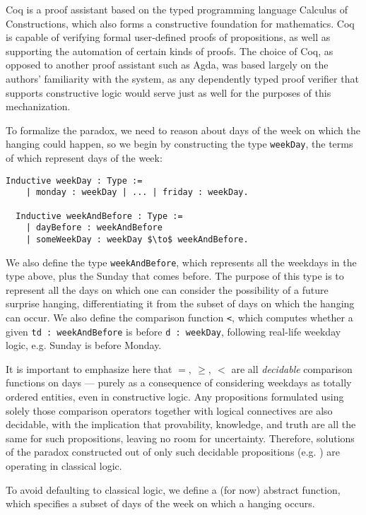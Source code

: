 \documentclass[runningheads]{llncs}
\begin{document}
Coq is a proof assistant based on the typed programming language Calculus of Constructions, which also forms a constructive foundation for mathematics.
Coq is capable of verifying formal user-defined proofs of propositions, as well as supporting
the automation of certain kinds of proofs. The choice of Coq, as opposed to another
proof assistant such as Agda, was based largely on the authors' familiarity with the system,
as any dependently typed proof verifier that supports constructive logic
would serve just as well for the purposes of this mechanization.

To formalize the paradox, we need to reason about days of the week on which
the hanging could happen, so we
begin by constructing the type {\tt weekDay}, the terms of which represent
days of the week:

\begin{lstlisting}[mathescape=true]
  Inductive weekDay : Type :=
    | monday : weekDay | ... | friday : weekDay.

  Inductive weekAndBefore : Type :=
    | dayBefore : weekAndBefore
    | someWeekDay : weekDay $\to$ weekAndBefore.
\end{lstlisting}

We also define the type {\tt weekAndBefore}, which represents all the weekdays in
the type above, plus the Sunday that comes before. The purpose of this type is to
represent all the days on which one can consider the possibility of a future
surprise hanging,
differentiating it from the subset of days on which the hanging can occur. We
also define the comparison function {\tt <}, which computes
whether a given {\tt td : weekAndBefore} is before {\tt d : weekDay},
following real-life weekday logic, e.g. Sunday is before Monday.

It is important to emphasize here that $=,~\geq,~<$ are all \emph{decidable}
comparison functions on days --- purely as a consequence of considering weekdays
as totally ordered entities, even in constructive logic. Any propositions
formulated using solely those comparison operators together with logical connectives are also decidable,
with the implication that provability, knowledge, and truth are all the same for such propositions,
leaving no room for uncertainty.
Therefore, solutions of the paradox constructed out of only such decidable propositions (e.g. \cite{godelinconsistent})
are operating in classical logic.

To avoid defaulting to classical logic, we define a (for now) abstract function,
which specifies a subset of
days of the week on which a hanging occurs.
\end{document}

